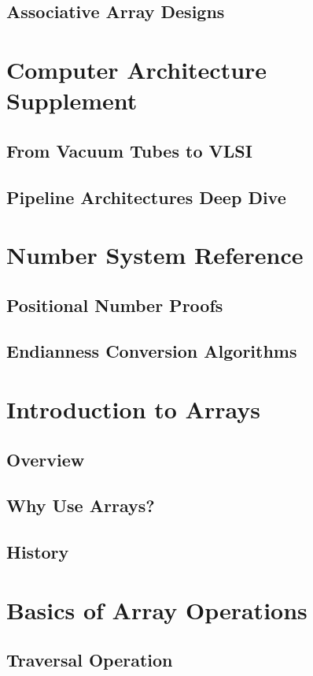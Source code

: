 \documentclass[12pt, oneside]{book}
\begin{document}
	 \section{Associative Array Designs}

	 \chapter{Computer Architecture Supplement}
	 \section{From Vacuum Tubes to VLSI}
	 \section{Pipeline Architectures Deep Dive}
	 
	 \chapter{Number System Reference}
	 \section{Positional Number Proofs}
	 \section{Endianness Conversion Algorithms}
	 
	\chapter{Introduction to Arrays}
	\section{Overview}
	\section{Why Use Arrays?}
	\section{History}
	\chapter{Basics of Array Operations}
	\section{Traversal Operation}
\end{document}
